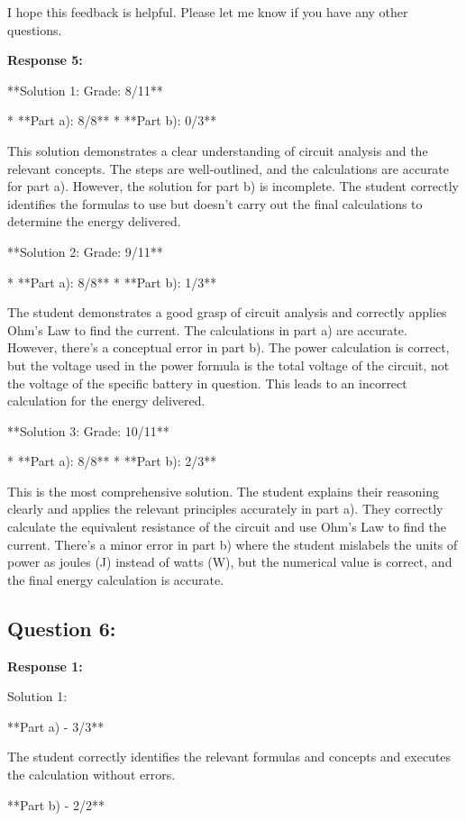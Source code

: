\documentclass[a4paper,11pt]{article}
\begin{document}
I hope this feedback is helpful. Please let me know if you have any other questions.

\bigskip    
\textbf{Response 5:}

**Solution 1: Grade: 8/11**

*   **Part a): 8/8**
*   **Part b): 0/3**

This solution demonstrates a clear understanding of circuit analysis and the relevant concepts. The steps are well-outlined, and the calculations are accurate for part a). However, the solution for part b) is incomplete. The student correctly identifies the formulas to use but doesn't carry out the final calculations to determine the energy delivered.

**Solution 2: Grade: 9/11**

*   **Part a): 8/8**
*   **Part b): 1/3**

The student demonstrates a good grasp of circuit analysis and correctly applies Ohm's Law to find the current. The calculations in part a) are accurate. However, there's a conceptual error in part b). The power calculation is correct, but the voltage used in the power formula is the total voltage of the circuit, not the voltage of the specific battery in question. This leads to an incorrect calculation for the energy delivered.

**Solution 3: Grade: 10/11**

*   **Part a): 8/8**
*   **Part b): 2/3**

This is the most comprehensive solution. The student explains their reasoning clearly and applies the relevant principles accurately in part a). They correctly calculate the equivalent resistance of the circuit and use Ohm's Law to find the current. There's a minor error in part b) where the student mislabels the units of power as joules (J) instead of watts (W), but the numerical value is correct, and the final energy calculation is accurate.

\subsection*{Question 6:}

\textbf{Response 1:}

Solution 1:

**Part a) - 3/3**

The student correctly identifies the relevant formulas and concepts and executes the calculation without errors.

**Part b) - 2/2**
\end{document}

